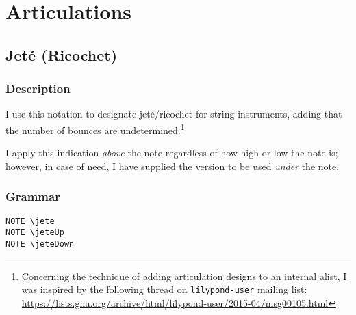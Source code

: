 

\chapter {Articulations}

\section {Jeté (Ricochet)}
\hfill
{}
\hfill

\subsection{Description}
I use this notation to designate jeté/ricochet for string instruments, adding that the number of bounces are undetermined.\footnote{Concerning the technique of adding articulation designs to an internal alist, I was inspired by the following thread on \Verb|lilypond-user| mailing list: \url{https://lists.gnu.org/archive/html/lilypond-user/2015-04/msg00105.html}}  

I apply this indication \textit{above} the note regardless of how high or low the note is; however, in case of need, I have supplied the version to be used \textit{under} the note.
\subsection{Grammar}
\begin{verbatim}
NOTE \jete
NOTE \jeteUp
NOTE \jeteDown
\end{verbatim}
